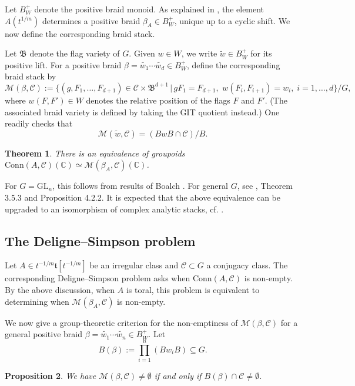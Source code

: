 \documentclass[11pt]{amsart}
\newtheorem{thm}{Theorem}
\newtheorem{prop}[thm]{Proposition}
\theoremstyle{definition}
\newcommand{\bC}{\mathbb{C}}
\newcommand{\fB}{\mathfrak{B}}
\newcommand{\GL}{\mathrm{GL}}
\newcommand{\ft}{\mathfrak{t}}
\newcommand{\cC}{\mathcal{C}}
\newcommand{\cM}{\mathcal{M}}
\newcommand{\Conn}{\mathrm{Conn}}
\begin{document}
  
Let $B_W^+$ denote the positive braid monoid. As explained in \cite[\S 4.3.3]{BBAMY}, the element $A(t^{1/m})$ determines a positive braid $\beta_A\in B_W^+$, unique up to a cyclic shift. We now define the corresponding braid stack. 

Let $\fB$ denote the flag variety of $G$. 
Given $w\in W$, we write $\widetilde{w}\in B_W^+$ for its positive lift. 
For a positive braid $\beta=\widetilde{w_1}\cdots \widetilde{w_d}\in B_W^+$, define the corresponding braid stack by
\[
\cM(\beta,\cC):=\bigg\{
(g,F_1,\dots,F_{d+1})\in \cC\times \fB^{d+1}
\,\bigg|\,
gF_1=F_{d+1}, \, \, w(F_i,F_{i+1})=w_i,\; i=1,\ldots,d
\bigg\}\bigg/G,
\]
where $w(F,F')\in W$ denotes the relative position of the flags $F$ and $F'$. (The associated braid variety is defined by taking the GIT quotient instead.) One readily checks that 
\[
\cM(\widetilde{w}, \cC) = (BwB\cap \cC)/B.
\] 


\begin{thm} 
There is an equivalence of groupoids
$\Conn(A,\cC)(\bC)\simeq \cM(\beta_A,\cC)(\bC)$. 
\end{thm}

For $G=\GL_n$, this follows from results of Boalch \cite{BoalchTopology}. For general $G$, see \cite{HJ}, Theorem 3.5.3 and Proposition 4.2.2. 
It is expected that the above equivalence can be upgraded to an isomorphism of complex analytic stacks, cf. \cite[Conjecture 4.4.4]{BBAMY}. 




\subsection{The Deligne--Simpson problem} 
Let $A \in t^{-1/m}\ft[t^{-1/m}]$ be an irregular class and $\cC\subset G$ a conjugacy class. 
The corresponding Deligne--Simpson problem  asks when $\Conn(A,\cC)$ is non-empty.
By the above discussion, when $A$ is toral, this problem is equivalent to determining when  $\cM(\beta_A,\cC)$ is non-empty. 


We now give a group-theoretic criterion for the non-emptiness of $\cM(\beta,\cC)$ for a general positive braid $\beta=\widetilde{w_1}\cdots \widetilde{w_n}\in B_W^+$. Let
\[
B(\beta):=\prod_{i=1}^n (Bw_iB)\subseteq G.
\]
\begin{prop}\label{p:group}
We have $\cM(\beta,\cC)\neq\emptyset$ if and only if $B(\beta)\cap \cC\neq\emptyset$.
\end{prop}
\end{document}
